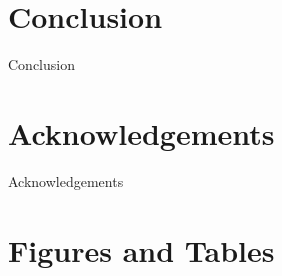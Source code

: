 \documentclass[twocolumn,twoside]{article}
\begin{document}
\section*{Conclusion}
Conclusion

\section*{Acknowledgements}
Acknowledgements

%

{\footnotesize}

\clearpage
\section*{Figures and Tables}
\end{document}
